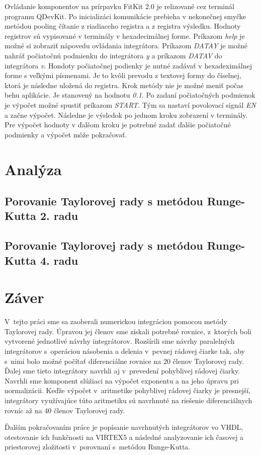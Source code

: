 Ovládanie komponentov na prírpavku FitKit 2.0 je relizované cez terminál programu QDevKit. Po inicializáci komunikácie prebieha v nekonečnej smyčke metódou pooling čítanie z riadiaceho registra a z registra výsledku. Hodnoty registrov sú vypisované v terminály v hexadecimálnej forme. Príkazom \textit{help} je možné si zobraziť nápovedu ovládania integrátora. Príkazom \textit{DATAY} je možné nahráť počiatočnú podmienku do integrátora \textit{y} a príkazom \textit{DATAV} do integrátora \textit{v}. Hondoty počiatočnej podienky je nutné zadávať v hexadeximálnej forme s veľkými písmenami. Je to kvôli prevodu z textovej formy do číselnej, ktorá je následne uložená do registra. Krok metódy nie je možné meniť počas behu aplikácie. Je stanovený na hodnotu \textit{0.1}. Po zadaní počiatočných podmienok je výpočet možné spustiť príkazom \textit{START}. Tým sa nastaví povolovací signál \textit{EN} a začne výpočet. Následne je výsledok po jednom kroku zobrazení v terminály. Pre výpočet hodnoty v ďalšom kroku je potrebné zadať ďalšie počiatočné podmienky a výpočet môže pokračovať.



\chapter{Analýza}
\section{Porovanie Taylorovej rady s metódou Runge-Kutta 2. radu}
\section{Porovanie Taylorovej rady s metódou Runge-Kutta 4. radu}

\chapter{Záver}
V~tejto práci sme sa zaoberali numerickou integráciou pomocou metódy Taylorovej rady. Úpravou jej členov sme získali potrebné rovnice, z~ktorých boli vytvorené jednotlivé návrhy integrátorov.
Rozšírili sme návrhy paralelných integrátorov s~operáciou násobenia a delenia v~pevnej rádovej čiarke tak, aby s~nimi bolo možné počítať diferenciálne rovnice na 20 členov Taylorovej rady. Ďalej sme tieto integrátory navrhli aj v~prevedení pohyblivej rádovej čiarky. Navrhli sme komponent slúžiaci na výpočet exponentu a na jeho úpravu pri normalizácii. Keďže výpočet v~aritmetike pohyblivej rádovej čiarky je presnejší, integrátory využívajúce túto aritmetiku sú navrhnuté na riešenie diferenciálnych rovníc až na 40 členov Taylorovej rady.

Ďalším pokračovaním práce je popísanie navrhnutých integrátorov vo VHDL, otestovanie ich funkčnosti na VIRTEX5 a následné analyzovanie ich časovej a priestorovej zložitosti v~porovnaní s~metódou Runge-Kutta.

